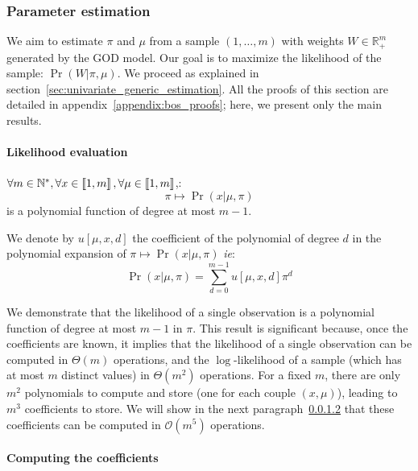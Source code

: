 \subsubsection{Parameter estimation}

We aim to estimate $\pi$ and $\mu$ from a sample $(1, \dots, m)$ with weights $W \in \mathbb{R}_{+}^m$ generated by the GOD model. Our goal is to maximize the likelihood of the sample: $\Pr(W | \pi, \mu)$. We proceed as explained in section~\ref{sec:univariate_generic_estimation}. All the proofs of this section are detailed in appendix~\ref{appendix:bos_proofs}; here, we present only the main results.

\paragraph{Likelihood evaluation}

\begin{thm}
    $\forall m \in \mathbb{N}^*, \forall x \in \left\llbracket1, m\right\rrbracket, \forall \mu \in \left\llbracket1, m\right\rrbracket$,:
    \[ \pi \mapsto \Pr(x | \mu, \pi) \]
    is a polynomial function of degree at most $m - 1$.  
\end{thm}

\begin{definition}
    We denote by $u[\mu, x, d]$ the coefficient of the polynomial of degree $d$ in the polynomial expansion of $\pi \mapsto \Pr(x | \mu, \pi)$ \textit{ie}:
    \[ \Pr(x | \mu, \pi) = \sum_{d = 0}^{m - 1} u[\mu, x, d] \pi^d \]
\end{definition}

We demonstrate that the likelihood of a single observation is a polynomial function of degree at most $m - 1$ in $\pi$. This result is significant because, once the coefficients are known, it implies that the likelihood of a single observation can be computed in $\Theta(m)$ operations, and the $\log$-likelihood of a sample (which has at most $m$ distinct values) in $\Theta(m^2)$ operations. For a fixed $m$, there are only $m^2$ polynomials to compute and store (one for each couple $(x, \mu)$), leading to $m^3$ coefficients to store. We will show in the next paragraph~\ref{sec:bos_coefficients} that these coefficients can be computed in $\mathcal O(m^5)$ operations.

\paragraph{Computing the coefficients}
\label{sec:bos_coefficients}

